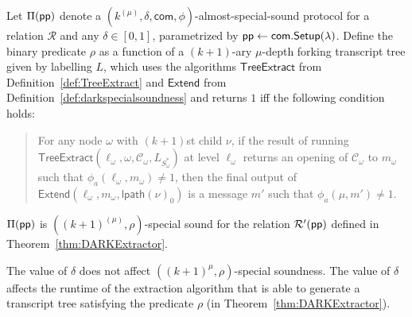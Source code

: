 \begin{lemma} \label{lem:DARKExtractor}
Let $\Pi(\textsf{pp})$ denote a $(k^{(\mu)}, \delta, \textsf{com}, \phi)$-almost-special-sound protocol for a relation $\mathcal{R}$ and any $\delta \in [0,1]$, parametrized by $\textsf{pp} \gets \textsf{com}.\textsf{{Setup}}(\lambda)$. Define the binary predicate $\rho$ as a function of a $(k+1)$-ary $\mu$-depth forking transcript tree given by labelling $L$, which uses the algorithms $\textsf{TreeExtract}$ from Definition~\ref{def:TreeExtract} and $\textsf{Extend}$ from Definition~\ref{def:darkspecialsoundness} and returns $1$ iff the following condition holds: 

\begin{quote} For any node $\omega$ with $(k+1)$st child $\nu$, if the result of running $\textsf{TreeExtract}(\ell_\omega, \omega, \mathcal{C}_\omega, L_{S^*_\omega})$ at level $\ell_\omega$ returns an opening of $\mathcal{C}_\omega$ to $m_\omega$ such that $\phi_a(\ell_\omega, m_\omega) \neq 1$, then the final output of $\textsf{Extend}(\ell_\omega, m_\omega, \textsf{lpath}(\nu)_0)$ is a message $m'$ such that $\phi_a(\mu, m') \neq 1$. 	
\end{quote}


$\Pi(\textsf{pp})$ is $((k+1)^{(\mu)}, \rho)$-special sound for the relation $\mathcal{R}'(\textsf{pp})$ defined in Theorem~\ref{thm:DARKExtractor}. 
 	
\end{lemma}
\begin{remark}
 The value of $\delta$ does not affect $((k+1)^\mu, \rho)$-special soundness. The value of $\delta$ affects the runtime of the extraction algorithm that is able to generate a transcript tree satisfying the predicate $\rho$ (in Theorem~\ref{thm:DARKExtractor}). 
\end{remark}
